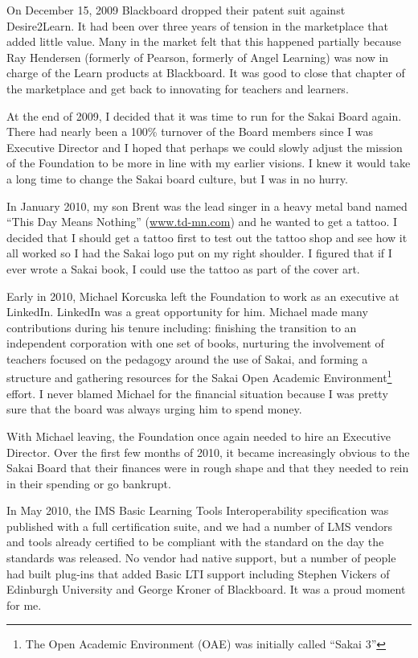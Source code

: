 \documentclass[12pt]{book}
\begin{document}
On December 15, 2009 Blackboard dropped their patent suit against
Desire2Learn.  It had been over three years of tension in the marketplace
that added little value.  Many in the market felt that this happened
partially because
Ray Hendersen (formerly of Pearson, formerly of Angel Learning)
was now in charge of the Learn products at Blackboard.
It was good to close that chapter of the marketplace and get back to
innovating for teachers and learners.

At the end of 2009, I decided that it was time to run for the Sakai Board
again.  There had nearly been a 100\% turnover of the Board members since
I was Executive Director and I hoped that perhaps we could slowly adjust the
mission of the Foundation to be more in line with my earlier visions.
I knew it would take a long time to change the Sakai board culture, but I was
in no hurry.

In January 2010, my son Brent was the lead singer in a heavy metal band
named ``This Day Means Nothing'' (\url{www.td-mn.com}) and he wanted to get
a tattoo.  I decided that I should get a tattoo first to test out the tattoo shop
and see how it all worked so I had the Sakai logo put on my right shoulder.
I figured that if I ever wrote a Sakai book, I could use the tattoo as part
of the cover art.

Early in 2010, Michael Korcuska left the Foundation to work as an executive
at LinkedIn.  LinkedIn was a great opportunity for him.
Michael made many contributions during his tenure including:
finishing the transition to an independent corporation with one set of books,
nurturing the involvement of teachers focused on the pedagogy around the use of Sakai,
and forming a structure and gathering resources for the Sakai Open Academic
Environment\footnote{The Open Academic Environment (OAE) was initially called
``Sakai 3''} effort.
I never blamed Michael
for the financial situation because I was pretty sure that the board was always urging him
to spend money.

With Michael leaving, the Foundation once again needed to hire an Executive Director.
Over the first few months of 2010, it became increasingly obvious
to the Sakai Board that their finances were in rough shape and that
they needed to rein in their spending or go bankrupt.

In May 2010, the IMS Basic Learning Tools Interoperability specification
was published with a full certification suite, and we had a number of LMS
vendors and tools already certified to be compliant with the standard on the day
the standards was released.   No vendor had native support, but a number
of people had built plug-ins that added Basic LTI support including Stephen Vickers
of Edinburgh University and George Kroner of Blackboard.
It was a proud moment for me.
\end{document}
